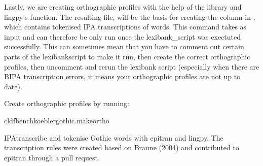 \documentclass[letterpaper,10pt,english]{sphinxmanual}
\begin{document}
\sphinxAtStartPar
Lastly, we are creating orthographic profiles with the help of the
 library and lingpy’s
function. The resulting file,  will be the basis for
creating the column  in , which contains
tokenised IPA transcriptions of words. This command takes 
as input and can therefore be only run once the lexibank\_script was exectuted
successfully. This can sometimes mean that you have to comment out certain
parts of the lexibank\sphinxhyphen{}script to make it run, then create the correct
orthographic profiles, then uncomment and rerun the lexibank script
(especially when there are BIPA transcription errors, it means your
orthographic profiles are not up to date).

\sphinxAtStartPar
Create orthographic profiles by running:

\begin{sphinxVerbatim}[commandchars=\\\{\}]
cldfbenchkoeblergothic.makeortho
\end{sphinxVerbatim}
\label{\detokenize{mkcldf:module-koeblergothiccommands.makeortho}}
\sphinxAtStartPar
IPA\sphinxhyphen{}transcribe and tokenise Gothic words with epitran and lingpy.
The transcription rules were created based on Braune (2004) and contributed
to epitran through a pull request.
\end{document}
